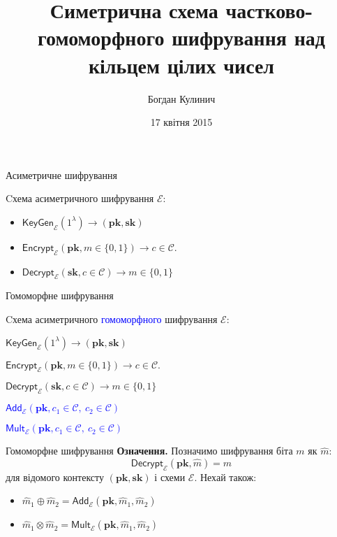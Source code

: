 \documentclass[pdf]{beamer}
\title{Симетрична схема частково-гомоморфного шифрування над кільцем цілих чисел}
\date[2015]{17 квітня 2015}
\author{Богдан Кулинич}
\begin{document}
\begin{frame}
\titlepage
\end{frame}


\begin{frame}{Асиметричне шифрування}

Cхема асиметричного шифрування \( \mathcal{E} \):

\begin{itemize}
	
	\item \( \mathsf{KeyGen}_\mathcal{E}( 1^\lambda ) \rightarrow ( \mathbf{pk}, \mathbf{sk} ) \)
	\item \( \mathsf{Encrypt}_\mathcal{E}( \mathbf{pk}, m \in \{0, 1\} ) \rightarrow c \in \mathcal{C}. \)
	\item \( \mathsf{Decrypt}_\mathcal{E}( \mathbf{sk}, c \in \mathcal{C} ) \rightarrow m \in \{ 0, 1 \} \)
	
\end{itemize}

\end{frame}


\begin{frame}{Гомоморфне шифрування}

Cхема асиметричного \textcolor{blue}{гомоморфного} шифрування \( \mathcal{E} \):

\begin{itemize}
	
	\item \( \mathsf{KeyGen}_\mathcal{E}( 1^\lambda ) \rightarrow ( \mathbf{pk}, \mathbf{sk} ) \)
	\item \( \mathsf{Encrypt}_\mathcal{E}( \mathbf{pk}, m \in \{0, 1\} ) \rightarrow c \in \mathcal{C}. \)
	\item \( \mathsf{Decrypt}_\mathcal{E}( \mathbf{sk}, c \in \mathcal{C} ) \rightarrow m \in \{ 0, 1 \} \)
	\textcolor{blue}{
	\item \( \mathsf{Add}_\mathcal{E}( \mathbf{pk} , c_1 \in \mathcal{C}, ~ c_2 \in \mathcal{C} ) \)
	\item \( \mathsf{Mult}_\mathcal{E}( \mathbf{pk} , c_1 \in \mathcal{C}, ~ c_2 \in \mathcal{C} ) \)}
	
\end{itemize}
\end{frame}

\begin{frame}{Гомоморфне шифрування}
\textbf{Означення.} Позначимо шифрування біта \( m \) як \( \hat m \):
\[ \mathsf{Decrypt}_\mathcal{E}( \mathbf{pk}, \hat m ) = m \]
для відомого контексту \( (\mathbf{pk}, \mathbf{sk}) \) і схеми \( \mathcal{E} \). Нехай також:

\begin{itemize}
\setlength{\itemindent}{10em}
\item[(Гомоморфне додавання)] \( \hat m_1 \oplus \hat m_2 = \mathsf{Add}_\mathcal{E}( \mathbf{pk}, \hat m_1, \hat m_2 )  \)
\item[(Гомоморфне множення)] \( \hat m_1 \otimes \hat m_2 = \mathsf{Mult}_\mathcal{E}( \mathbf{pk}, \hat m_1, \hat m_2 ) \)
\end{itemize}

\end{frame}
\end{document}
